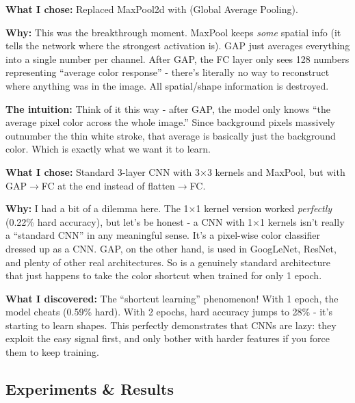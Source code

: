 \documentclass[9pt,a4paper,twocolumn,twoside]{tau-class/tau}
\begin{document}
        \begin{tauenv}[frametitle=Decision: Global Average Pooling to Destroy Shape Information]
            \textbf{What I chose:} Replaced MaxPool2d with  (Global Average Pooling).

            \textbf{Why:} This was the breakthrough moment. MaxPool keeps \textit{some} spatial info (it tells the network where the strongest activation is). GAP just averages everything into a single number per channel. After GAP, the FC layer only sees 128 numbers representing ``average color response'' - there's literally no way to reconstruct where anything was in the image. All spatial/shape information is destroyed.

            \textbf{The intuition:} Think of it this way - after GAP, the model only knows ``the average pixel color across the whole image.'' Since background pixels massively outnumber the thin white stroke, that average is basically just the background color. Which is exactly what we want it to learn.
        \end{tauenv}

        \begin{tauenv}[frametitle={Decision: SimpleGAPCNN (3$\times$3 + GAP) over SimpleCNN (1$\times$1)}]
            \textbf{What I chose:} Standard 3-layer CNN with 3$\times$3 kernels and MaxPool, but with GAP$\rightarrow$FC at the end instead of flatten$\rightarrow$FC.

            \textbf{Why:} I had a bit of a dilemma here. The 1$\times$1 kernel version worked \textit{perfectly} (0.22\% hard accuracy), but let's be honest - a CNN with 1$\times$1 kernels isn't really a ``standard CNN'' in any meaningful sense. It's a pixel-wise color classifier dressed up as a CNN. GAP, on the other hand, is used in GoogLeNet, ResNet, and plenty of other real architectures. So  is a genuinely standard architecture that just happens to take the color shortcut when trained for only 1 epoch.

            \textbf{What I discovered:} The ``shortcut learning'' phenomenon! With 1 epoch, the model cheats (0.59\% hard). With 2 epochs, hard accuracy jumps to 28\% - it's starting to learn shapes. This perfectly demonstrates that CNNs are lazy: they exploit the easy signal first, and only bother with harder features if you force them to keep training.
        \end{tauenv}

    \subsection{Experiments \& Results}
\end{document}
